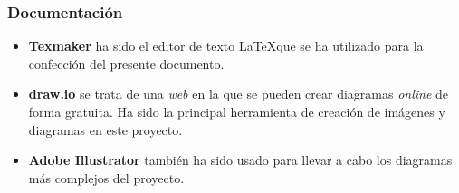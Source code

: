 \subsubsection{Documentación}

\begin{itemize}
\item \textbf{Texmaker} ha sido el editor de texto \LaTeX que se ha utilizado para la confección del presente documento.
\item \textbf{draw.io} se trata de una \textit{web} en la que se pueden crear diagramas \textit{online} de forma gratuita. Ha sido la principal herramienta de creación de imágenes y diagramas en este proyecto.
\item \textbf{Adobe Illustrator} también ha sido usado para llevar a cabo los diagramas más complejos del proyecto.
\end{itemize}